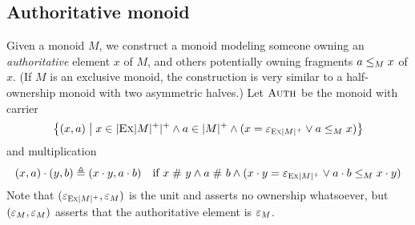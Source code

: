 %
%
%
%

\subsection{Authoritative monoid}\label{sec:auth}

Given a monoid $M$, we construct a monoid modeling someone owning an \emph{authoritative} element $x$ of $M$, and others potentially owning fragments $\melt \le_M x$ of $x$.
(If $M$ is an exclusive monoid, the construction is very similar to a half-ownership monoid with two asymmetric halves.)
Let $\auth{M}$ be the monoid with carrier
\[
	\setComp{ (x, \melt) }{ x \in \mcarp{\exm{\mcarp{M}}} \land \melt \in \mcarp{M} \land (x = \munit_{\exm{\mcarp{M}}} \lor \melt \leq_M x) }
\]
and multiplication
\[
(x, \melt) \mtimes (y, \meltB) \eqdef
     (x \mtimes y, \melt \mtimes \meltB) \quad \mbox{if } x \sep y \land \melt \sep \meltB \land (x \mtimes y = \munit_{\exm{\mcarp{M}}} \lor \melt \mtimes \meltB \leq_M x \mtimes y)
\]
Note that $(\munit_{\exm{\mcarp{M}}}, \munit_M)$ is the unit and asserts no ownership whatsoever, but $(\munit_{M}, \munit_M)$ asserts that the authoritative element is $\munit_M$.

